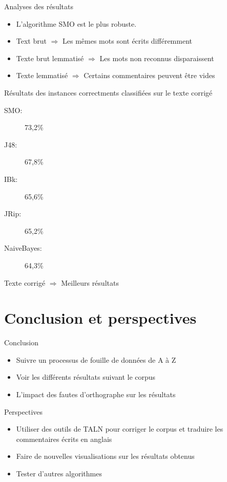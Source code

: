 \documentclass{beamer}
\begin{document}
\begin{frame}
	\begin{block}{Analyses des résultats}
	\begin{itemize}
		\item L'algorithme SMO est le plus robuste.
		\item Text brut $\Rightarrow$ Les mêmes mots sont écrits différemment
		\item Texte brut lemmatisé $\Rightarrow$ Les mots non reconnus disparaissent
		\item Texte lemmatisé $\Rightarrow$ Certains commentaires peuvent être vides
	\end{itemize}

	\end{block}
\end{frame}

\begin{frame}
	\begin{block}{Résultats des instances correctments classifiées sur le texte corrigé}
		\begin{description}
			\item[SMO: ]73,2\%
			\item[J48: ]67,8\%
			\item[IBk: ]65,6\%
			\item[JRip: ]65,2\%
			\item[NaiveBayes: ]64,3\%
		\end{description}	
		
		Texte corrigé $\Rightarrow$ Meilleurs résultats
	\end{block}
\end{frame}

\section{Conclusion et perspectives}
\begin{frame}
	\begin{block}{Conclusion}
		\begin{itemize}
			\item Suivre un processus de fouille de données de A à Z
			\item Voir les différents résultats suivant le corpus
			\item L'impact des fautes d'orthographe sur les résultats
		\end{itemize}
	\end{block}
\end{frame}

\begin{frame}
	\begin{block}{Perspectives}
	
	\begin{itemize}
		\item Utiliser des outils de TALN pour corriger le corpus et traduire les commentaires écrits en anglais
		\item Faire de nouvelles visualisations sur les résultats obtenus
		\item Tester d'autres algorithmes
	\end{itemize}
	
	\end{block}
\end{frame}
\end{document}
